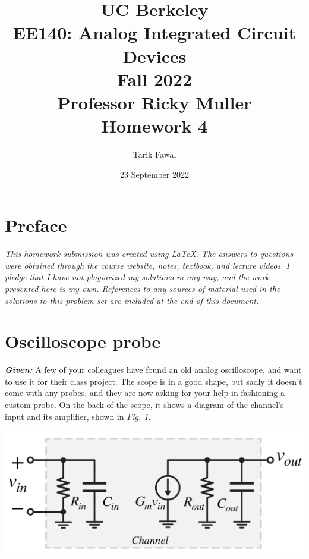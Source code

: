 \documentclass[12pt, fleqn]{article}
\title {
    \normalsize{UC Berkeley}\\
    \large{{EE140: Analog Integrated Circuit Devices\\Fall 2022\\Professor Ricky Muller\\}}
    \vspace{0.5ex}
    \Huge{Homework 4}
    \vspace{0.5ex}
}
\author{Tarik Fawal}
\date{23 September 2022}
\begin{document}
\maketitle
\tableofcontents
\flushbottom
    \section*{Preface}
        \textit{\emph{This homework submission was created using \LaTeX.  The answers to questions were obtained through the course website, notes, textbook, and lecture videos.  I pledge that I have not plagiarized my solutions in any way, and the work presented here is my own.  References to any sources of material used in the solutions to this problem set are included at the end of this document.}}
\newpage
\section{Oscilloscope probe}
\textbf{\emph{Given: }} A few of your colleagues have found an old analog oscilloscope, and want to use it for their class project. The scope is in a good shape, but sadly it doesn’t come with any probes, and they are now asking for your help in fashioning a custom probe.  On the back of the scope, it shows a diagram of the channel’s input and its amplifier, shown in \textit{Fig. 1}.

\includegraphics[scale=0.35, center]{p1a1.PNG}\\
\end{document}
